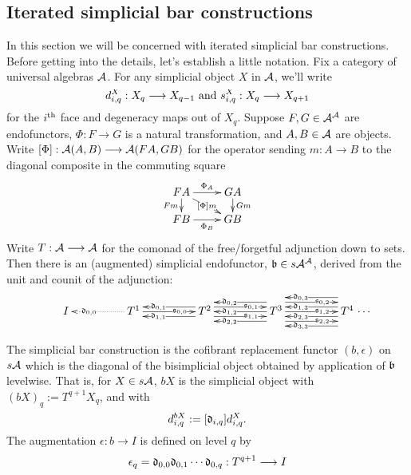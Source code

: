 \documentclass[10pt]{article}
\newcommand{\algCat}{\calA}
\newcommand{\trip}[3]{{#1}_{\smash{#2}}^{\smash{#3}}}
\begin{document}
\begin{iteratedBarConstructions}
\subsection{Iterated simplicial bar constructions}
In this section we will be concerned with iterated simplicial bar constructions. Before getting into the details, let's establish a little notation. Fix a category of universal algebras $\algCat$. For any simplicial object $X$ in $\algCat$, we'll write 
\[\trip{d}{i,q}{X}:X_q\to X_{q-1}\textup{\ and\ }\trip{s}{i,q}{X}:X_q\to X_{q+1}\]
for the $i^\textup{th}$ face and degeneracy maps out of $X_q$. Suppose $F,G\in\algCat^\algCat$ are endofunctors, $\Phi:F\to G$ is a natural transformation, and $A,B\in\algCat$ are objects. Write $[\Phi]:\algCat(A,B)\to\algCat(FA,GB)$ for the operator sending $m:A\to B$ to the diagonal composite in the commuting square
\[\xymatrix@R=4mm{
FA
\ar[r]^-{\Phi_A}
\ar[d]_-{Fm}
\ar[dr]|-{[\Phi]m}
&%
GA
\ar[d]^-{Gm}
\\%
FB
\ar[r]_-{\Phi_B}
&%
GB
}\]
Write $T:\algCat\to \algCat$ for the comonad of the free/forgetful adjunction down to sets. Then there is an (augmented) simplicial endofunctor, $\frakb\in s\algCat^\algCat$, derived from the unit and counit of the adjunction:
\[\vcenter{
\def\labelstyle{\scriptstyle}
\xymatrix@C=1.65cm@1{
{\ I\,}
&
\,T^1\,
\ar@{..>}[l]|(.65){\frakd_{0,0}}
\ar[r]|(.65){\fraks_{0,0}}
&
\,T^2\,
\ar@<-1ex>[l]|(.65){\frakd_{0,1}}
\ar@<+1ex>[l]|(.65){\frakd_{1,1}}
\ar@<+1ex>[r]|(.65){\fraks_{0,1}}
\ar@<-1ex>[r]|(.65){\fraks_{1,1}}
&
\,T^3\,
\ar[l]|(.65){\frakd_{1,2}}
\ar@<-2ex>[l]|(.65){\frakd_{0,2}}
\ar@<+2ex>[l]|(.65){\frakd_{2,2}}
\ar[r]|(.65){\fraks_{1,2}}
\ar@<+2ex>[r]|(.65){\fraks_{0,2}}
\ar@<-2ex>[r]|(.65){\fraks_{2,2}}
&
\,T^4\,\makebox[0cm][l]{\,$\cdots $}
\ar@<-3ex>[l]|(.65){\frakd_{0,3}}
\ar@<-1ex>[l]|(.65){\frakd_{1,3}}
\ar@<+1ex>[l]|(.65){\frakd_{2,3}}
\ar@<+3ex>[l]|(.65){\frakd_{3,3}}
}}\]




The simplicial bar construction is the cofibrant replacement functor $(b,\epsilon)$ on $s\algCat$ which is the diagonal of the bisimplicial object obtained by application of $\mathfrak{b}$ levelwise. That is, for $X\in s\algCat$, $bX$ is the simplicial object with $(bX)_q:=T^{q+1}X_q$, and with
\[\trip{d}{i,q}{bX}:=[\frakd_{i,q}]\trip{d}{i,q}{X}.\]
The augmentation $\epsilon:b\to I$ is defined on level $q$ by 
\[\epsilon_q=\mathfrak{d}_{0,0}\mathfrak{d}_{0,1}\cdots \mathfrak{d}_{0,q}:T^{q+1}\longrightarrow I\]



\end{iteratedBarConstructions}
\end{document}

